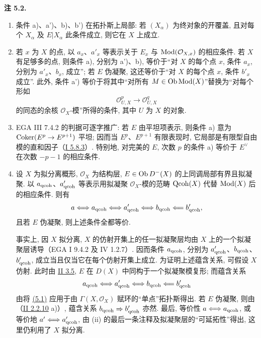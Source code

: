\textbf{注 5.2.}
\begin{enumerate}[label=\roman*)]
\item 条件 a)、a')、b)、b') 在拓扑斯上局部: 若 \((X_\alpha)\) 为终对象的开覆盖, 且对每个 \(X_\alpha\) 及 \(E|X_\alpha\) 此条件成立, 则它在 \(X\) 上成立.
\item 若 \(x\) 为 \(X\) 的点, 以 \(a_x\)、\(a'_x\) 等表示关于 \(E_x\) 与 \(\operatorname{Mod}(\mathcal O_{X,x})\) 的相应条件. 若 \(X\) 有足够多的点, 则条件 a), 分别为 a')、b), 等价于“对 \(X\) 的每个点 \(x\), 条件 \(a_x\), 分别为 \(a'_x\)、\(b_x\), 成立”; 若 \(E\) 伪凝聚, 这还等价于“对 \(X\) 的每个点 \(x\), 条件 \(b'_x\) 成立”. 此外, 条件 a') 等价于将其中“对所有 \(M\in\operatorname{Ob}\operatorname{Mod}(X)\)”替换为“对每个形如
\[
\mathcal O_{U,X}^{p}\longrightarrow\mathcal O_{U,X}^{q}
\]
的同态的余核 \(\mathcal O_X\)-模”所得的条件, 其中 \(U\) 为 \(X\) 的对象.
\item EGA III 7.4.2 的判据可逐字推广: 若 \(E\) 由平坦项表示, 则条件 a) 意为 \(\operatorname{Coker}(E^p\to E^{p+1})\) 平坦; 因而当 \(E^p\)、\(E^{p+1}\) 有限表现时, 它局部是有限型自由模的直和因子（\hyperlink{sga6.e01.lem.5-8-3}{I 5.8.3}）. 特别地, 对完美的 \(E\), 次数 \(p\) 的条件 a) 等价于 \(E^{\vee}\) 在次数 \(-p-1\) 的相应条件.
\item 设 \(X\) 为拟分离概形, \(\mathcal O_X\) 为结构层, \(E\in\operatorname{Ob} D^{-}(X)\) 的上同调局部有界且拟凝聚. 以 \(a_{\mathrm{qcoh}}\)、\(a'_{\mathrm{qcoh}}\) 等表示用拟凝聚 \(\mathcal O_X\)-模的范畴 \(\operatorname{Qcoh}(X)\) 代替 \(\operatorname{Mod}(X)\) 后的相应条件. 则有
\[
a\Longleftrightarrow a_{\mathrm{qcoh}}\Longleftrightarrow a'_{\mathrm{qcoh}}\Longleftrightarrow b_{\mathrm{qcoh}}\Longleftarrow b'_{\mathrm{qcoh}},
\]
且若 \(E\) 伪凝聚, 则上述条件全都等价.

事实上, 因 \(X\) 拟分离, \(X\) 的仿射开集上的任一拟凝聚层均由 \(X\) 上的一个拟凝聚层诱导（EGA I 9.4.2 及 IV 1.2.7）. 因而条件 \(a_{\mathrm{qcoh}}\), 分别为 \(a'_{\mathrm{qcoh}}\)、\(b_{\mathrm{qcoh}}\)、\(b'_{\mathrm{qcoh}}\), 成立当且仅当它在每个仿射开集上成立. 为证明上述蕴含关系, 可假设 \(X\) 仿射. 此时由 \hyperlink{sga6.e02.prop.3-5}{II 3.5}, \(E\) 在 \(D(X)\) 中同构于一个拟凝聚模复形; 而蕴含关系
\[
a_{\mathrm{qcoh}}\Longleftrightarrow a'_{\mathrm{qcoh}}\Longleftrightarrow b_{\mathrm{qcoh}}\Longleftarrow b'_{\mathrm{qcoh}}
\]
由将 \hyperlink{sga6.e03.lem.5-1}{(5.1)} 应用于由 \(\Gamma(X,\mathcal O_X)\) 赋环的“单点”拓扑斯得出. 若 \(E\) 伪凝聚, 则由（\hyperlink{sga6.e02.rem.2-2-10}{II 2.2.10} a)）, 蕴含关系 \(b_{\mathrm{qcoh}}\Rightarrow b'_{\mathrm{qcoh}}\) 亦然. 最后, 等价性 \(a\Longleftrightarrow a_{\mathrm{qcoh}}\), 或等价地 \(a'\Longleftrightarrow a'_{\mathrm{qcoh}}\), 由 (ii) 的最后一条注释及拟凝聚层的“可延拓性”得出, 这里仍利用了 \(X\) 拟分离.
\end{enumerate}

